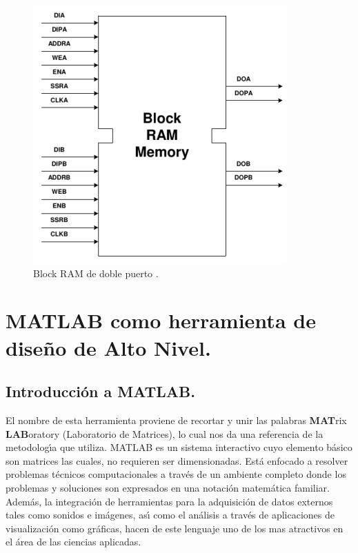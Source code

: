 \begin{figure}[H]
\begin{centering}
\includegraphics[scale=0.7]{img/bram_block}
\par\end{centering}
\caption{Block RAM de doble puerto \cite{clb_ov}.}

\end{figure}


\section{MATLAB como herramienta de dise\~{n}o de Alto Nivel.}

\subsection{Introducci\'{o}n a MATLAB.}

El nombre de esta herramienta proviene de recortar y unir las palabras
\textbf{MAT}rix \textbf{LAB}oratory (Laboratorio de Matrices), lo
cual nos da una referencia de la metodolog\'{\i}a que utiliza. MATLAB
es un sistema interactivo cuyo elemento b\'{a}sico son matrices las
cuales, no requieren ser dimensionadas. Est\'{a} enfocado a resolver
problemas t\'{e}cnicos computacionales a trav\'{e}s de un ambiente
completo donde los problemas y soluciones son expresados en una notaci\'{o}n
matem\'{a}tica familiar\cite{Matlab_overview}. Adem\'{a}s, la integraci\'{o}n
de herramientas para la adquisici\'{o}n de datos externos tales como
sonidos e im\'{a}genes, as\'{\i} como el an\'{a}lisis a trav\'{e}s
de aplicaciones de visualizaci\'{o}n como gr\'{a}ficas, hacen de este
lenguaje uno de los mas atractivos en el \'{a}rea de las ciencias
aplicadas.

